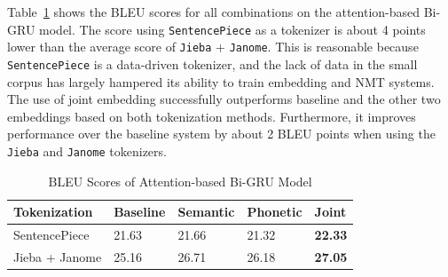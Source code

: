 Table~\ref{tab:seq2seq_bleu_score} shows the BLEU scores for all combinations on the attention-based Bi-GRU model. The score using \texttt{SentencePiece} as a tokenizer is about 4 points lower than the average score of \texttt{Jieba} + \texttt{Janome}. This is reasonable because \texttt{SentencePiece} is a data-driven tokenizer, and the lack of data in the small corpus has largely hampered its ability to train embedding and NMT systems. The use of joint embedding successfully outperforms baseline and the other two embeddings based on both tokenization methods. Furthermore, it improves performance over the baseline system by about 2 BLEU points when using the \texttt{Jieba} and \texttt{Janome} tokenizers.

\begin{table}[t]
    \centering
    \begin{tabularx}{\textwidth}{bbbbb}\toprule
        Tokenization & Baseline & Semantic & Phonetic & Joint \\\midrule
        SentencePiece & 21.63 & 21.66 & 21.32 & \textbf{22.33} \\
        Jieba + Janome & 25.16 & 26.71 & 26.18 & \textbf{27.05} \\\bottomrule
    \end{tabularx}
    \caption{BLEU Scores of Attention-based Bi-GRU Model}
    \label{tab:seq2seq_bleu_score}
\end{table}

